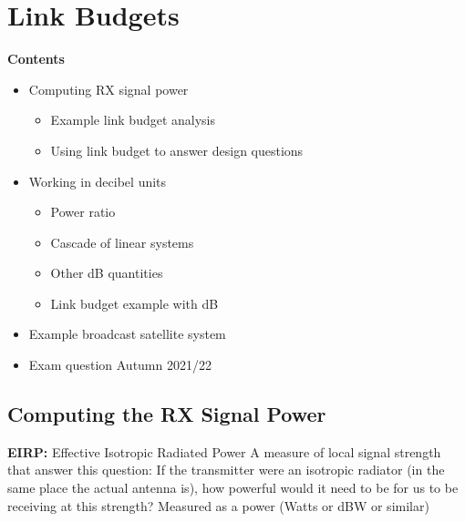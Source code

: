 \documentclass[12pt]{article}
\begin{document}
\section{Link Budgets}
\textbf{Contents}

\begin{itemize}[noitemsep]
    \item Computing RX signal power
    \begin{itemize}[noitemsep]
        \item Example link budget analysis
        \item Using link budget to answer design questions
    \end{itemize}
    \item Working in decibel units
    \begin{itemize}[noitemsep]
        \item Power ratio
        \item Cascade of linear systems
        \item Other dB quantities
        \item Link budget example with dB
    \end{itemize}
    \item Example broadcast satellite system
    \item Exam question Autumn 2021/22
\end{itemize}

\subsection{Computing the RX Signal Power}

\textbf{EIRP:} Effective Isotropic Radiated Power
A measure of local signal strength that answer this question: If the transmitter were an isotropic radiator (in the same place the actual antenna is), how powerful would it need to be for us to be receiving at this strength?
Measured as a power (Watts or dBW or similar)
\end{document}
